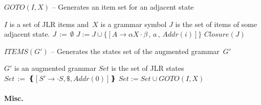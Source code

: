 \begin{algorithm}
  \caption{\label{Algorithm:Goto}
    $GOTO(I,X)$ -- Generates an item set for an adjacent state}
  \begin{algorithmic}
    \REQUIRE $I$ is a set of JLR items and~$X$ is a grammar symbol
    \ENSURE $J$ is the set of items of some adjacent state.
    \STATE $J \, := \, \emptyset $
      \STATE $ J := J \cup \{ [ A \rightarrow \alpha X \cdot \beta \, , \, a \, , \, Addr(i) ] \}$
    \ENDFOR
    \RETURN $Closure(J)$
  \end{algorithmic}
\end{algorithm}

\begin{algorithm}
  \caption{\label{Algorithm:States}
    $ITEMS(G')$ -- Generates the states set of the augmented grammar~$G'$}
  \begin{algorithmic}
    \REQUIRE $G'$ is an augmented grammar
    \ENSURE $Set$ is the set of JLR states
    \STATE $Set \, := \, ❴[S'→·S , \$ , Addr(0)]❵$
    \REPEAT
	    \STATE $ Set := Set ∪ GOTO(I,X)$
	  \ENDIF
	\ENDFOR
      \ENDFOR
  \end{algorithmic}
\end{algorithm}

\paragraph{Misc.}

